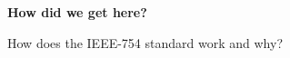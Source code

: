 \begin{frame}

\vspace{\fill}

\begin{center}

\huge \textbf{How did we get here?}

\vspace{0.5in}

\large How does the IEEE-754 standard work and why?

\end{center}

\vspace{\fill}

\end{frame}
